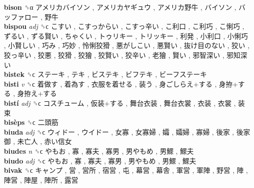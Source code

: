 \textbf{bison} ␝α   アメリカバイソン ,  アメリカヤギュウ ,  アメリカ野牛 ,  バイソン ,  バッファロー ,  野牛   \\
\textbf{bispou} \emph{adj}  ␝ϲ   こすい ,  こすっからい ,  こすっ辛い ,  こ利口 ,  こ利巧 ,  こ悧巧 ,  ずるい ,  ずる賢い ,  ちゃくい ,  トゥリキー ,  トリッキー ,  利発 ,  小利口 ,  小悧巧 ,  小賢しい ,  巧み ,  巧妙 ,  怜悧狡猾 ,  悪がしこい ,  悪賢い ,  抜け目のない ,  狡い ,  狡っ辛い ,  狡悪 ,  狡猾 ,  狡獪 ,  狡賢い ,  狡辛い ,  老獪 ,  賢い ,  邪智深い ,  邪知深い   \\
\textbf{bistek} ␝ϲ   ステーキ ,  テキ ,  ビステキ ,  ビフテキ ,  ビーフステーキ   \\
\textbf{bisti} \emph{v}  ␝ϲ   着做す ,  着為す ,  衣服を着せる ,  装う ,  身ごしらえ+する ,  身拵+する ,  身拵え+する   \\
\textbf{bistí} \emph{adj}  ␝ϲ   コスチューム ,  仮装+する ,  舞台衣装 ,  舞台衣裳 ,  衣装 ,  衣裳 ,  装束   \\
\textbf{bisèps} ␝ϲ   二頭筋   \\
\textbf{biuda} \emph{adj}  ␝ϲ   ウィドー ,  ウイドー ,  女寡 ,  女寡婦 ,  孀 ,  孀婦 ,  寡婦 ,  後家 ,  後家御 ,  未亡人 ,  赤い信女   \\
\textbf{biudes} \emph{n}  ␝ϲ   やもお ,  寡 ,  寡夫 ,  寡男 ,  男やもめ ,  男鰥 ,  鰥夫   \\
\textbf{biudo} \emph{adj}  ␝ϲ   やもお ,  寡 ,  寡夫 ,  寡男 ,  男やもめ ,  男鰥 ,  鰥夫   \\
\textbf{bivak} ␝ϲ   キャンプ ,  営 ,  営所 ,  宿営 ,  屯 ,  幕営 ,  幕舎 ,  軍営 ,  軍陣 ,  野営 ,  陣 ,  陣営 ,  陣屋 ,  陣所 ,  露営   \\
